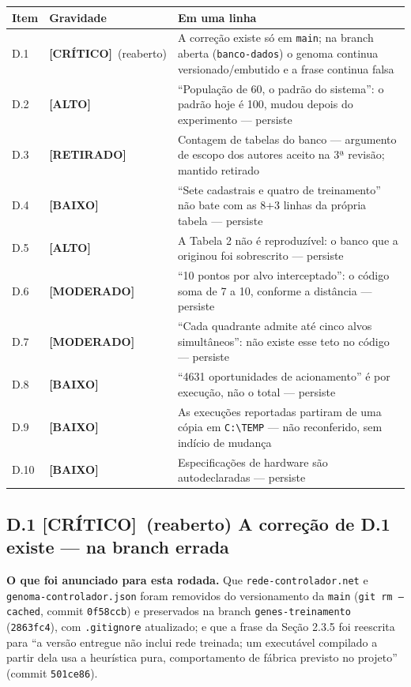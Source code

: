\documentclass[11pt,a4paper]{article}
\newcommand{\critico}{\textbf{\color{red!60!black}[CRÍTICO]}}
\newcommand{\alto}{\textbf{\color{orange!70!black}[ALTO]}}
\newcommand{\moderado}{\textbf{\color{blue!50!black}[MODERADO]}}
\newcommand{\baixo}{\textbf{\color{gray}[BAIXO]}}
\newcommand{\retirado}{\textbf{[RETIRADO]}}
\begin{document}
\renewcommand{\arraystretch}{1.25}
\begin{longtable}{|p{0.9cm}|p{2.6cm}|p{11.6cm}|}
\hline
\textbf{Item} & \textbf{Gravidade} & \textbf{Em uma linha} \\
\hline
\endhead
D.1 & \critico\ (reaberto) & A correção existe só em \texttt{main}; na branch aberta
(\texttt{banco-dados}) o genoma continua versionado/embutido e a frase continua falsa \\
\hline
D.2 & \alto & ``População de 60, o padrão do sistema'': o padrão hoje é 100, mudou depois do
experimento --- persiste \\
\hline
D.3 & \retirado & Contagem de tabelas do banco --- argumento de escopo dos autores aceito na 3ª
revisão; mantido retirado \\
\hline
D.4 & \baixo & ``Sete cadastrais e quatro de treinamento'' não bate com as 8+3 linhas da própria
tabela --- persiste \\
\hline
D.5 & \alto & A Tabela 2 não é reproduzível: o banco que a originou foi sobrescrito --- persiste \\
\hline
D.6 & \moderado & ``10 pontos por alvo interceptado'': o código soma de 7 a 10, conforme a distância
--- persiste \\
\hline
D.7 & \moderado & ``Cada quadrante admite até cinco alvos simultâneos'': não existe esse teto no
código --- persiste \\
\hline
D.8 & \baixo & ``4631 oportunidades de acionamento'' é por execução, não o total --- persiste \\
\hline
D.9 & \baixo & As execuções reportadas partiram de uma cópia em \texttt{C:\textbackslash TEMP} ---
não reconferido, sem indício de mudança \\
\hline
D.10 & \baixo & Especificações de hardware são autodeclaradas --- persiste \\
\hline
\end{longtable}

\subsection*{D.1 \critico\ (reaberto) A correção de D.1 existe --- na branch errada}

\textbf{O que foi anunciado para esta rodada.} Que \texttt{rede-controlador.net} e
\texttt{genoma-controlador.json} foram removidos do versionamento da \texttt{main} (\texttt{git rm
--cached}, commit \texttt{0f58ccb}) e preservados na branch \texttt{genes-treinamento}
(\texttt{2863fc4}), com \texttt{.gitignore} atualizado; e que a frase da Seção 2.3.5 foi reescrita
para ``a versão entregue não inclui rede treinada; um executável compilado a partir dela usa a
heurística pura, comportamento de fábrica previsto no projeto'' (commit \texttt{501ce86}).
\end{document}
